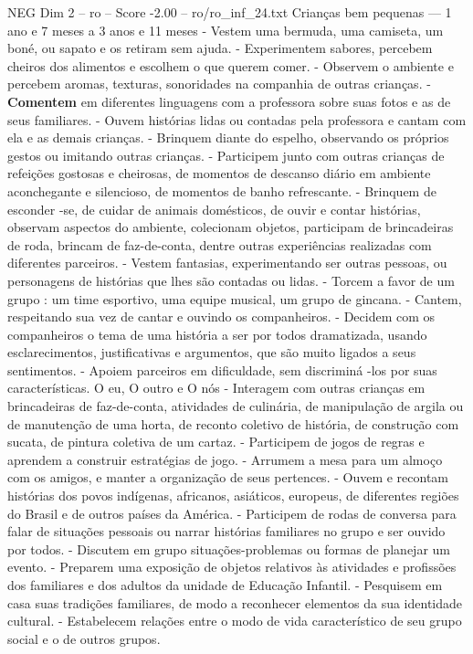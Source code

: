 \begin{textsample}{NEG Dim 2 – ro – Score -2.00 – ro/ro\_inf\_24.txt}  \label{ex:f2_neg_107}
Crianças bem pequenas — 1 ano e 7 meses a 3 anos e 11 meses - Vestem uma bermuda, uma camiseta, um boné, ou sapato e os retiram sem ajuda. - Experimentem sabores, percebem cheiros dos alimentos e escolhem o que querem comer. - Observem o ambiente e percebem aromas, texturas, sonoridades na companhia de outras crianças. - \textbf{Comentem} em diferentes linguagens com a professora sobre suas fotos e as de seus familiares. - Ouvem histórias lidas ou contadas pela professora e cantam com ela e as demais crianças. - Brinquem diante do espelho, observando os próprios gestos ou imitando outras crianças. - Participem junto com outras crianças de refeições gostosas e cheirosas, de momentos de descanso diário em ambiente aconchegante e silencioso, de momentos de banho refrescante. - Brinquem de esconder -se, de cuidar de animais domésticos, de ouvir e contar histórias, observam aspectos do ambiente, colecionam objetos, participam de brincadeiras de roda, brincam de faz-de-conta, dentre outras experiências realizadas com diferentes parceiros. - Vestem fantasias, experimentando ser outras pessoas, ou personagens de histórias que lhes são contadas ou lidas. - Torcem a favor de um grupo : um time esportivo, uma equipe musical, um grupo de gincana. - Cantem, respeitando sua vez de cantar e ouvindo os companheiros. - Decidem com os companheiros o tema de uma história a ser por todos dramatizada, usando esclarecimentos, justificativas e argumentos, que são muito ligados a seus sentimentos. - Apoiem parceiros em dificuldade, sem discriminá -los por suas características.
O eu, O outro e O nós - Interagem com outras crianças em brincadeiras de faz-de-conta, atividades de culinária, de manipulação de argila ou de manutenção de uma horta, de reconto coletivo de história, de construção com sucata, de pintura coletiva de um cartaz. - Participem de jogos de regras e aprendem a construir estratégias de jogo. - Arrumem a mesa para um almoço com os amigos, e manter a organização de seus pertences. - Ouvem e recontam histórias dos povos indígenas, africanos, asiáticos, europeus, de diferentes regiões do Brasil e de outros países da América. - Participem de rodas de conversa para falar de situações pessoais ou narrar histórias familiares no grupo e ser ouvido por todos. - Discutem em grupo situações-problemas ou formas de planejar um evento. - Preparem uma exposição de objetos relativos às atividades e profissões dos familiares e dos adultos da unidade de Educação Infantil. - Pesquisem em casa suas tradições familiares, de modo a reconhecer elementos da sua identidade cultural. - Estabelecem relações entre o modo de vida característico de seu grupo social e o de outros grupos.

\end{textsample}
